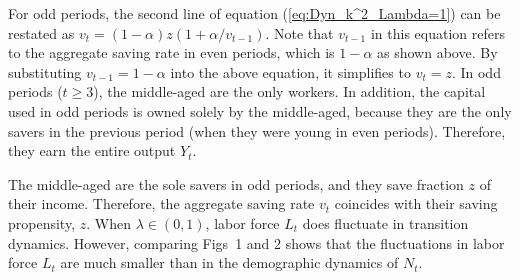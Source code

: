 \documentclass{MBE}%
\begin{document}
{For odd periods, the second line of equation (\ref{eq:Dyn_k^2_Lambda=1}) can
be restated as $v_{t}=\left(  1-\alpha\right)  z \left(  1+{\alpha}/{v_{t-1}%
}\right)  $. Note that $v_{t-1}$ in this equation refers to the aggregate saving rate in even
periods, which is $1-\alpha$ as shown above. By substituting $v_{t-1}=1-\alpha$ into the above
equation, it simplifies to $v_{t}=z$. In odd periods ($t\geq3$), the middle-aged are the only
workers. In addition, the capital used in odd periods is owned solely by the middle-aged, because
they are the only savers in the previous period (when they were young in even periods). Therefore,
they earn the entire output $Y_{t}$.

\begin{flLem}
The middle-aged are the sole savers in odd periods, and they save fraction $z$ of their income.
Therefore, the aggregate saving rate $v_{t}$ coincides with their saving propensity, $z$. {When
$\lambda\in(0,1)$, labor force $L_{t}$ does fluctuate in transition dynamics. However, comparing
Figs~1 and 2 shows that the fluctuations in labor force $L_{t}$ are much smaller than in the
demographic dynamics of $N_{t}$.}
\end{flLem}

}
\end{document}
